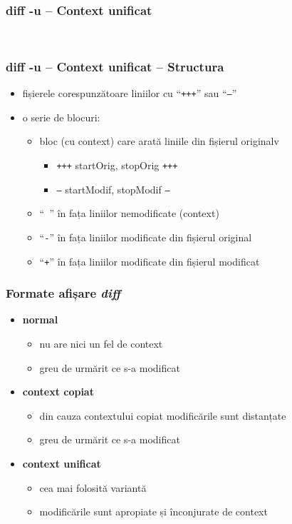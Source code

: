\documentclass{beamer}
\begin{document}
\begin{frame}
  \frametitle{\textbf{diff -u} – Context unificat}
  \tt{}
\end{frame}

\begin{frame}
  \frametitle{\textbf{diff -u} – Context unificat – Structura}
  \begin{itemize}
  \item fișierele corespunzătoare liniilor cu ``\texttt{\texttt{+++}}'' sau ``\texttt{---}''
    \item o serie de blocuri:
      \begin{itemize}
      \item bloc (cu context) care arată liniile din fișierul originalv
        \begin{itemize} 
        \item \texttt{+++} startOrig, stopOrig \texttt{+++}
        \item \texttt{---} startModif, stopModif \texttt{---}
        \end{itemize}
      \item ``\texttt{ }'' în fața liniilor nemodificate (context)
      \item ``\texttt{-}'' în fața liniilor modificate din fișierul original
      \item ``\texttt{+}'' în fața liniilor modificate din fișierul modificat
      \end{itemize}
  \end{itemize}
\end{frame}

\begin{frame}
  \frametitle{\textbf Formate afișare \textit{diff}}
  \begin{itemize}[<+->]
    \item \textbf{normal}
      \begin{itemize}[<+->]
        \item nu are nici un fel de context
        \item greu de urmărit ce s-a modificat
      \end{itemize}

    \item \textbf{context copiat}
      \begin{itemize}
        \item din cauza contextului copiat modificările sunt distanțate
        \item greu de urmărit ce s-a modificat
      \end{itemize}
      
    \item \textbf{context unificat}
      \begin{itemize}
        \item cea mai folosită variantă
        \item modificările sunt apropiate și înconjurate de context
      \end{itemize}
  \end{itemize}
\end{frame}
    
\end{document}

